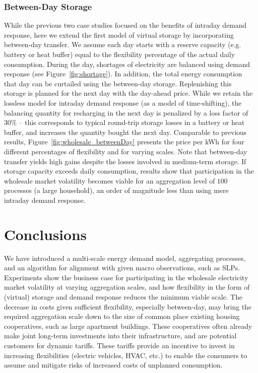 \documentclass[conference]{IEEEtran}
\begin{document}
\subsubsection{Between-Day Storage}
While the previous two case studies focused on the benefits of intraday demand response, here we extend the first model of virtual storage by incorporating between-day transfer. We assume each day starts with a reserve capacity (e.g. battery or heat buffer) equal to the flexibility percentage of the actual daily consumption. During the day, shortages of electricity are balanced using demand response (see Figure~\ref{fig:shortage}). In addition, the total energy consumption that day can be curtailed using the between-day storage. Replenishing this storage is planned for the next day with the day-ahead price. While we retain the lossless model for intraday demand response (as a model of time-shifting), the balancing quantity for recharging in the next day is penalized by a loss factor of $30\%$ -- this corresponds to typical round-trip storage losses in a battery or heat buffer, and increases the quantity bought the next day. Comparable to previous results, Figure~\ref{fig:wholesale_betweenDay} presents the price per kWh for four different percentages of flexibility and for varying scales. Note that between-day transfer yields high gains despite the losses involved in medium-term storage. If storage capacity exceeds daily consumption, results show that participation in the wholesale market volatility becomes viable for an aggregation level of $100$ processes (a large household), an order of magnitude less than using mere intraday demand response.


\section{Conclusions}
\label{sec:Conclusion}

We have introduced a multi-scale energy demand model, aggregating processes, and an algorithm for alignment with given macro observations, such as SLPs. Experiments show the business case for participating in the wholesale electricity market volatility at varying aggregation scales, and how flexibility in the form of (virtual) storage and demand response reduces the minimum viable scale. The decrease in costs given sufficient flexibility, especially between-day, may bring the required aggregation scale down to the size of common place existing housing cooperatives, such as large apartment buildings. These cooperatives often already make joint long-term investments into their infrastructure, and are potential customers for dynamic tariffs. These tariffs provide an incentive to invest in increasing flexibilities (electric vehicles, HVAC, etc.) to enable the consumers to assume and mitigate risks of increased costs of unplanned consumption.
\end{document}
